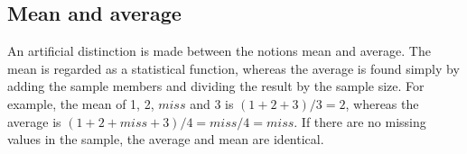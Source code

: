 \subsection{Mean and average}

An artificial distinction is made between the notions mean and average.
The mean is regarded as a statistical function, whereas the average is found simply
by adding the sample members and dividing the result by the sample size.
For example, the mean of 1, 2, $miss$ and 3 is $(1+2+3)/3=2$,
whereas the average is $(1+2+miss+3)/4=miss/4=miss$.
If there are no missing values in the sample, the average and mean are identical.
